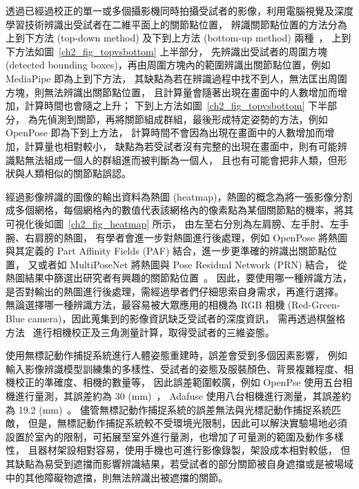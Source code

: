 透過已經過校正的單一或多個攝影機同時拍攝受試者的影像，利用電腦視覺及深度學習技術辨識出受試者在二維平面上的關節點位置，
辨識關節點位置的方法分為上到下方法 (top-down method) 及下到上方法 (bottom-up method) 兩種~\cite{nie2019single}，
上到下方法如圖~\ref{ch2_fig_topvsbottom} 上半部分，
先辨識出受試者的周圍方塊 (detected bounding boxes)，再由周圍方塊內的範圍辨識出關節點位置，例如 MediaPipe 即為上到下方法，
其缺點為若在辨識過程中找不到人，無法匡出周圍方塊，則無法辨識出關節點位置，
且計算量會隨著出現在畫面中的人數增加而增加，計算時間也會隨之上升；
下到上方法如圖~\ref{ch2_fig_topvsbottom} 下半部分，
為先偵測到關節，再將關節組成群組，最後形成特定姿勢的方法，例如 OpenPose 即為下到上方法，
計算時間不會因為出現在畫面中的人數增加而增加，計算量也相對較小，
缺點為若受試者沒有完整的出現在畫面中，則有可能辨識點無法組成一個人的群組進而被判斷為一個人，
且也有可能會把非人類，但形狀與人類相似的關節點誤認。

經過影像辨識的圖像的輸出資料為熱圖 (heatmap)，熱圖的概念為將一張影像分割成多個網格，每個網格內的數值代表該網格內的像素點為某個關節點的機率，將其可視化後如圖~\ref{ch2_fig_heatmap} 所示，
由左至右分別為左肩膀、左手肘、左手腕、右肩膀的熱圖，
有學者會進一步對熱圖進行後處理，例如 OpenPose 將熱圖與其定義的 Part Affinity Fields (PAF) 結合，進一步更準確的辨識出關節點位置，
又或者如 MultiPoseNet 將熱圖與 Pose Residual Network (PRN) 結合，
從熱圖結果中篩選出研究者有興趣的關節點位置~\cite{kocabas2018multiposenet}。
因此，要使用哪一種辨識方法，是否對輸出的熱圖進行後處理，需經過學者們仔細思索自身需求，再進行選擇。
無論選擇哪一種辨識方法，最容易被大眾應用的相機為 RGB 相機 (Red-Green-Blue camera)，因此蒐集到的影像資訊缺乏受試者的深度資訊，
需再透過棋盤格方法~\cite{zhang1999flexible} 進行相機校正及三角測量計算，取得受試者的三維姿態。

使用無標記動作捕捉系統進行人體姿態重建時，誤差會受到多個因素影響，
例如輸入影像辨識模型訓練集的多樣性、受試者的姿態及服裝顏色、背景複雜程度、相機校正的準確度、相機的數量等，
因此誤差範圍較廣，例如 OpenPse 使用五台相機進行量測，其誤差約為 30 (mm)~\cite{nakano2020evaluation}，
Adafuse 使用八台相機進行測量，其誤差約為 19.2 (mm)~\cite{zhang2020adafuse}。
儘管無標記動作捕捉系統的誤差無法與光標記動作捕捉系統匹敵，
但是，無標記動作捕捉系統較不受環境光限制，因此可以解決實驗場地必須設置於室內的限制，可拓展至室外進行量測，也增加了可量測的範圍及動作多樣性，
且器材架設相對容易，使用手機也可進行影像錄製，架設成本相對較低，
但其缺點為易受到遮擋而影響辨識結果，若受試者的部分關節被自身遮擋或是被場域中的其他障礙物遮擋，則無法辨識出被遮擋的關節。

